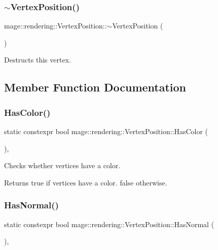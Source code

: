 \subsubsection{\texorpdfstring{$\sim$\+Vertex\+Position()}{~VertexPosition()}}
{\footnotesize\ttfamily mage\+::rendering\+::\+Vertex\+Position\+::$\sim$\+Vertex\+Position (\begin{DoxyParamCaption}{ }\end{DoxyParamCaption})\hspace{0.3cm}{\ttfamily [default]}}

Destructs this vertex. 

\subsection{Member Function Documentation}
\mbox{\label{structmage_1_1rendering_1_1_vertex_position_afe87ed5fda84b4acc17a94a07d389ff7}} 
\subsubsection{\texorpdfstring{Has\+Color()}{HasColor()}}
{\footnotesize\ttfamily static constexpr bool mage\+::rendering\+::\+Vertex\+Position\+::\+Has\+Color (\begin{DoxyParamCaption}{ }\end{DoxyParamCaption})\hspace{0.3cm}{\ttfamily [static]}, {\ttfamily [noexcept]}}

Checks whether vertices have a color.

\begin{DoxyReturn}{Returns}
{\ttfamily true} if vertices have a color. {\ttfamily false} otherwise. 
\end{DoxyReturn}
\mbox{\label{structmage_1_1rendering_1_1_vertex_position_abf33917c1c93dfcffd25c146b53189e8}} 
\subsubsection{\texorpdfstring{Has\+Normal()}{HasNormal()}}
{\footnotesize\ttfamily static constexpr bool mage\+::rendering\+::\+Vertex\+Position\+::\+Has\+Normal (\begin{DoxyParamCaption}{ }\end{DoxyParamCaption})\hspace{0.3cm}{\ttfamily [static]}, {\ttfamily [noexcept]}}

